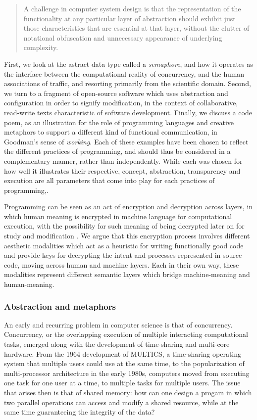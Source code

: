 \begin{quote}
  A challenge in computer system design is that the representation of the functionality at any particular layer of abstraction should exhibit just those characteristics that are essential at that layer, without the clutter of notational obfuscation and unnecessary appearance of underlying complexity. \citep{neumann_beauty_1990}
\end{quote}

First, we look at the astract data type called a \emph{semaphore}, and how it operates as the interface between the computational reality of concurrency, and the human associations of traffic, and resorting primarily from the scientific domain. Second, we turn to a fragment of open-source software which uses abstraction and configuration in order to signify modification, in the context of collaborative, read-write texts characteristic of software development. Finally, we discuss a code poem, as an illustration for the role of programming languages and creative metaphors to support a different kind of functional communication, in Goodman's sense of \emph{working}. Each of these examples have been chosen to reflect the different practices of programming, and should thus be considered in a complementary manner, rather than independently. While each was chosen for how well it illustrates their respective, concept, abstraction, transparency and execution are all parameters that come into play for each practices of programming,.

Programming can be seen as an act of encryption and decryption across layers, in which human meaning is encrypted in machine language for computational execution, with the possibility for such meaning of being decrypted later on for study and modification \citep{ledgard_coding_2011}. We argue that this encryption process involves different aesthetic modalities which act as a heuristic for writing functionally good code and provide keys for decrypting the intent and processes represented in source code, moving across human and machine layers. Each in their own way, these modalities represent different semantic layers which bridge machine-meaning and human-meaning.

\subsubsection{Abstraction and metaphors}
\label{subsubsec:abstraction-metaphors}

An early and recurring problem in computer science is that of concurrency. Concurrency, or the overlapping execution of multiple interacting computational tasks, emerged along with the development of time-sharing and multi-core hardware. From the 1964 development of MULTICS, a time-sharing operating system that multiple users could use at the same time, to the popularization of multi-processor architecture in the early 1980s, computers moved from executing one task for one user at a time, to multiple tasks for multiple users. The issue that arises then is that of shared memory: how can one design a progam in which two parallel operations can access and modify a shared resource, while at the same time guaranteeing the integrity of the data?

